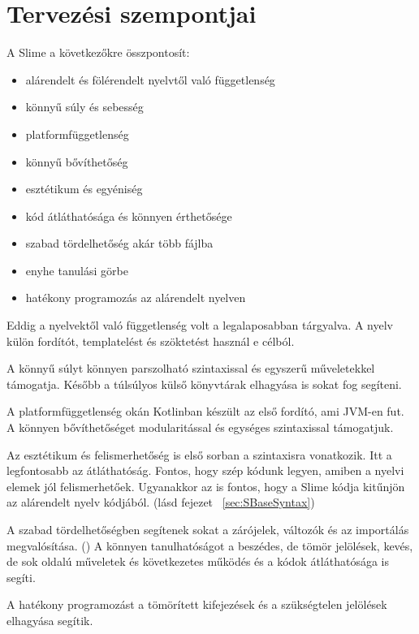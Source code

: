 \section{Tervezési szempontjai}
\label{sec:SDesign}
A Slime a következőkre összpontosít:
\begin{itemize}
\item alárendelt és fölérendelt nyelvtől való függetlenség
\item könnyű súly és sebesség
\item platformfüggetlenség
\item könnyű bővíthetőség
\item esztétikum és egyéniség
\item kód átláthatósága és könnyen érthetősége
\item szabad tördelhetőség akár több fájlba
\item enyhe tanulási görbe
\item hatékony programozás az alárendelt nyelven
\end{itemize}

Eddig a nyelvektől való függetlenség volt a legalaposabban tárgyalva. 
A nyelv külön fordítót, templatelést és szöktetést használ e célból.

A könnyű súlyt könnyen parszolható szintaxissal és egyszerű műveletekkel támogatja. 
Később a túlsúlyos külső könyvtárak elhagyása is sokat fog segíteni.

A platformfüggetlenség okán Kotlinban készült az első fordító, ami JVM-en fut. 
A könnyen bővíthetőséget modularitással és egységes szintaxissal támogatjuk.

Az esztétikum és felismerhetőség is első sorban a szintaxisra vonatkozik. 
Itt a legfontosabb az átláthatóság. 
Fontos, hogy szép kódunk legyen, amiben a nyelvi elemek jól felismerhetőek.
Ugyanakkor az is fontos, hogy a Slime kódja kitűnjön az alárendelt nyelv kódjából. (lásd fejezet ~\ref{sec:SBaseSyntax})

A szabad tördelhetőségben segítenek sokat a zárójelek, változók és az importálás megvalósítása. () 
A könnyen tanulhatóságot a beszédes, de tömör jelölések, kevés, de sok oldalú műveletek és következetes működés és a kódok átláthatósága is segíti.

A hatékony programozást a tömörített kifejezések és a szükségtelen jelölések elhagyása segítik.

